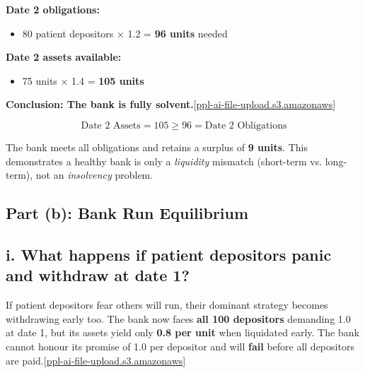\documentclass[a4paper]{article}
\begin{document}
\textbf{Date 2 obligations:}

\begin{itemize}
\item
  80 patient depositors × 1.2 = \textbf{96 units} needed
\end{itemize}

\textbf{Date 2 assets available:}

\begin{itemize}
\item
  75 units × 1.4 = \textbf{105 units}
\end{itemize}

\textbf{Conclusion: The bank is fully
solvent.}{[}\href{https://ppl-ai-file-upload.s3.amazonaws.com/web/direct-files/attachments/64012734/8ecdf432-f8fa-409d-b72d-017134eed977/Homework1.pdf}{ppl-ai-file-upload.s3.amazonaws}{]}\hspace{0pt}

\[\text{Date\ 2\ Assets} = 105 \geq 96 = \text{Date\ 2\ Obligations}\]

The bank meets all obligations and retains a surplus of \textbf{9
units}. This demonstrates a healthy bank is only a \emph{liquidity}
mismatch (short-term vs. long-term), not an \emph{insolvency} problem.

\hypertarget{part-b-bank-run-equilibrium}{%
\subsection{Part (b): Bank Run
Equilibrium}\label{part-b-bank-run-equilibrium}}

\hypertarget{i.-what-happens-if-patient-depositors-panic-and-withdraw-at-date-1}{%
\subsection{i. What happens if patient depositors panic and withdraw at
date
1?}\label{i.-what-happens-if-patient-depositors-panic-and-withdraw-at-date-1}}

If patient depositors fear others will run, their dominant strategy
becomes withdrawing early too. The bank now faces \textbf{all 100
depositors} demanding 1.0 at date 1, but its assets yield only
\textbf{0.8 per unit} when liquidated early. The bank cannot honour its
promise of 1.0 per depositor and will \textbf{fail} before all
depositors are
paid.{[}\href{https://ppl-ai-file-upload.s3.amazonaws.com/web/direct-files/attachments/64012734/8ecdf432-f8fa-409d-b72d-017134eed977/Homework1.pdf}{ppl-ai-file-upload.s3.amazonaws}{]}\hspace{0pt}
\end{document}
